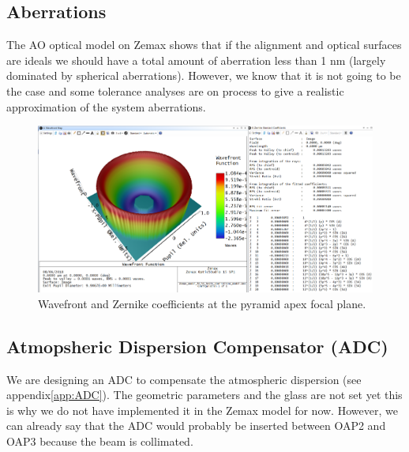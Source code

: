 \documentclass[12pt,a4paper]{article}
\begin{document}
\subsection{Aberrations}
The AO optical model on Zemax shows that if the alignment and optical surfaces are ideals we should have a total amount of aberration less than 1 nm (largely dominated by spherical aberrations). However, we know that it is not going to be the case and some tolerance analyses are on process to give a realistic approximation of the system aberrations.
\begin{figure}[H]
	\begin{center}
		\includegraphics[width=\textwidth]{images/WF_aberrations.PNG}
		\caption{Wavefront and Zernike coefficients at the pyramid apex focal plane.}\label{fig:WF_aberrations}
	\end{center}
\end{figure}

\subsection{Atmopsheric Dispersion Compensator (ADC)}\label{subsec:ADC}
We are designing an ADC to compensate the atmospheric dispersion (see appendix\ref{app:ADC}). The geometric parameters and the glass are not set yet this is why we do not have implemented it in the Zemax model for now. However, we can already say that the ADC would probably be inserted between OAP2 and OAP3 because the beam is collimated.
\newpage

\renewcommand{\bibname}{References}


\end{document}
